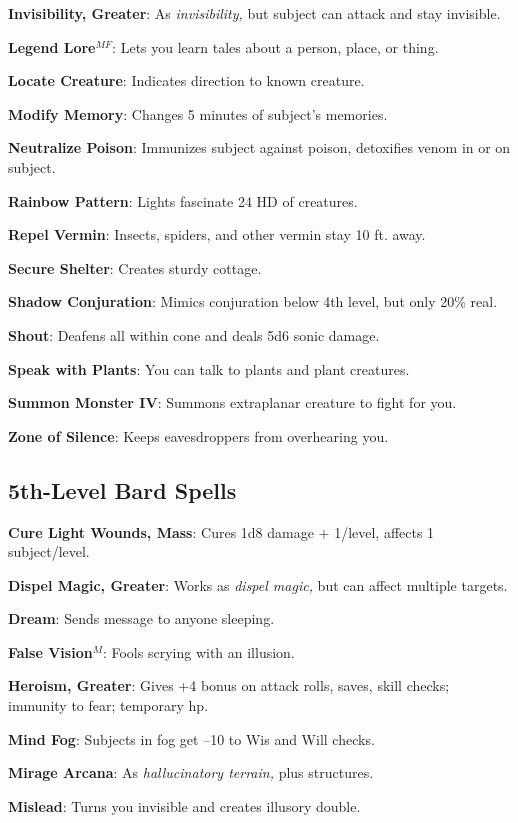 \textbf{Invisibility, Greater}: As \textit{invisibility, }but subject can attack and stay invisible.

\textbf{Legend Lore}\(^{MF}\): Lets you learn tales about a person, place, or thing.

\textbf{Locate Creature}: Indicates direction to known creature.

\textbf{Modify Memory}: Changes 5 minutes of subject's memories.

\textbf{Neutralize Poison}: Immunizes subject against poison, detoxifies venom in or on subject.

\textbf{Rainbow Pattern}: Lights fascinate 24 HD of creatures.

\textbf{Repel Vermin}: Insects, spiders, and other vermin stay 10 ft. away.

\textbf{Secure Shelter}: Creates sturdy cottage.

\textbf{Shadow Conjuration}: Mimics conjuration below 4th level, but only 20\% real.

\textbf{Shout}: Deafens all within cone and deals 5d6 sonic damage.

\textbf{Speak with Plants}: You can talk to plants and plant creatures.

\textbf{Summon Monster IV}: Summons extraplanar creature to fight for you.

\textbf{Zone of Silence}: Keeps eavesdroppers from overhearing you.

\subsection{5th-Level Bard Spells}


\textbf{Cure Light Wounds, Mass}: Cures 1d8 damage + 1/level, affects 1 subject/level.

\textbf{Dispel Magic, Greater}: Works as \textit{dispel magic,} but can affect multiple targets.

\textbf{Dream}: Sends message to anyone sleeping.

\textbf{False Vision}\(^{M}\): Fools scrying with an illusion.

\textbf{Heroism, Greater}: Gives +4 bonus on attack rolls, saves, skill checks; immunity to fear; temporary hp.

\textbf{Mind Fog}: Subjects in fog get --10 to Wis and Will checks.

\textbf{Mirage Arcana}: As \textit{hallucinatory terrain, }plus structures.

\textbf{Mislead}: Turns you invisible and creates illusory double.

